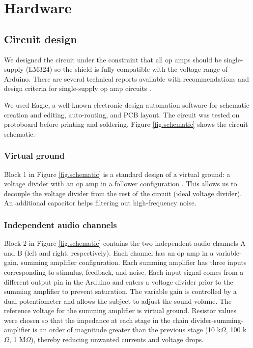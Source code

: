 \documentclass[twocolumn]{article}
\begin{document}
\section{Hardware}

\subsection{Circuit design}

We designed the circuit under the constraint that all op amps should be single-supply (LM324) so the shield is fully compatible with the voltage range of Arduino. There are several technical reports available with recommendations and design criteria for single-supply op amp circuits \cite{singlesupply2000}.

We used Eagle, a well-known electronic design automation software for schematic creation and editing, auto-routing, and PCB layout. The circuit was tested on protoboard before printing and soldering. Figure \ref{fig.schematic} shows the circuit schematic.


\subsubsection{Virtual ground}

Block 1 in Figure \ref{fig.schematic} is a standard design of a virtual ground: a voltage divider with an op amp in a follower configuration \cite{singlesupply2000}. This allows us to decouple the voltage divider from the rest of the circuit (ideal voltage divider). An additional capacitor helps filtering out high-frequency noise.


\subsubsection{Independent audio channels}

Block 2 in Figure \ref{fig.schematic} contains the two independent audio channels A and B (left and right, respectively). Each channel has an op amp in a variable-gain, summing amplifier configuration. Each summing amplifier has three inputs corresponding to stimulus, feedback, and noise. Each input signal comes from a different output pin in the Arduino and enters a voltage divider prior to the summing amplifier to prevent saturation. The variable gain is controlled by a dual potentiometer and allows the subject to adjust the sound volume. The reference voltage for the summing amplifier is virtual ground. Resistor values were chosen so that the impedance at each stage in the chain divider-summing-amplifier is an order of magnitude greater than the previous stage (10 k$\Omega$, 100 k$\Omega$, 1 M$\Omega$), thereby reducing unwanted currents and voltage drops.
\end{document}
